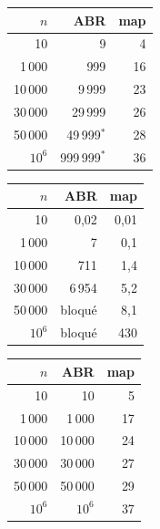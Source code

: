 \documentclass[11pt,a4paper]{article}
\begin{document}
\begin{table}[H]
\centering
\begin{minipage}[t]{0.31\textwidth}\centering
\begin{tabular}{r r r}
\toprule
$n$ & \textbf{ABR} & \textbf{map} \\
\midrule
10          & 9               & 4 \\
1\,000      & 999             & 16 \\
10\,000     & 9\,999          & 23 \\
30\,000     & 29\,999         & 26 \\
50\,000     & 49\,999$^*$     & 28 \\
$10^6$      & 999\,999$^*$    & 36 \\
\bottomrule
\end{tabular}
\end{minipage}
\hfill
\begin{minipage}[t]{0.33\textwidth}\centering
\begin{tabular}{r r r}
\toprule
$n$ & \textbf{ABR} & \textbf{map} \\
\midrule
10          & 0,02     & 0,01 \\
1\,000      & 7        & 0,1 \\
10\,000     & 711      & 1,4 \\
30\,000     & 6\,954   & 5,2 \\
50\,000     & \textcolor{rouge}{bloqué} & 8,1 \\
$10^6$      & \textcolor{rouge}{bloqué} & 430 \\
\bottomrule
\end{tabular}
\end{minipage}
\hfill
\begin{minipage}[t]{0.31\textwidth}\centering
\begin{tabular}{r r r}
\toprule
$n$ & \textbf{ABR} & \textbf{map} \\
\midrule
10          & 10          & 5 \\
1\,000      & 1\,000      & 17 \\
10\,000     & 10\,000     & 24 \\
30\,000     & 30\,000     & 27 \\
50\,000     & 50\,000     & 29 \\
$10^6$      & $10^6$      & 37 \\
\bottomrule
\end{tabular}
\end{minipage}
\end{table}
\end{document}
